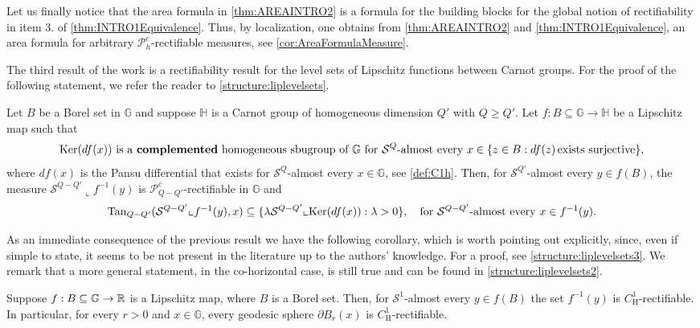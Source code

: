 \documentclass[10pt, a4paper,
oneside, headinclude,footinclude]{scrartcl}
\begin{document}
Let us finally notice that the area formula in \cref{thm:AREAINTRO2} is a formula for the building blocks for the global notion of rectifiability in item 3. of \cref{thm:INTRO1Equivalence}. Thus, by localization, one obtains from \cref{thm:AREAINTRO2} and \cref{thm:INTRO1Equivalence}, an area formula for arbitrary $\mathscr{P}_h^c$-rectifiable measures, see \cref{cor:AreaFormulaMeasure}.

The third result of the work is a rectifiability result for the level sets of Lipschitz functions between Carnot groups. For the proof of the following statement, we refer the reader to \cref{structure:liplevelsets}.

\begin{proposizione}\label{structure:liplevelsetsINTRO}
Let $B$ be a Borel set in $\mathbb{G}$ and suppose $\mathbb{H}$ is a Carnot group of homogeneous dimension $Q'$ with $Q\geq Q'$. Let $f:B\subseteq \mathbb{G}\to \mathbb{H}$ be a Lipschitz map such that
\begin{equation}
    \text{$\mathrm{Ker}(df(x))$ is a \textbf{complemented} homogeneous sbugroup of $\mathbb G$ for $\mathcal{S}^{Q}$-almost every $x\in \{z\in B:df(z)\, \text{exists surjective}\}$},
    \nonumber
\end{equation}
where $df(x)$ is the Pansu differential that exists for $\mathcal{S}^Q$-almost every $x\in\mathbb G$, see \cref{def:C1h}. Then, for $\mathcal{S}^{Q'}$-almost every $y\in f(B)$, the measure $\mathcal{S}^{Q-Q'}\llcorner f^{-1}(y)$ is $\mathscr{P}^c_{Q-Q'}$-rectifiable in $\mathbb{G}$ and 
$$
\mathrm{Tan}_{Q-Q'}(\mathcal{S}^{Q-Q'}\llcorner f^{-1}(y),x)\subseteq\{\lambda\mathcal{S}^{Q-Q'}\llcorner\mathrm{Ker}(df(x)):\lambda> 0\},\quad\text{for $\mathcal{S}^{Q-Q'}$-almost every $x\in f^{-1}(y)$.}
$$
\end{proposizione}

As an immediate consequence of the previous result we have the following corollary, which is worth pointing out explicitly, since, even if simple to state, it seems to be not present in the literature up to the authors' knowledge. For a proof, see \cref{structure:liplevelsets3}. We remark that a more general statement, in the co-horizontal case, is still true and can be found in \cref{structure:liplevelsets2}.

\begin{corollario}\label{structure:liplevelsets3Intro}
Suppose $f:B\subseteq \mathbb{G}\to \mathbb{R}$ is a Lipschitz map, where $B$ is a Borel set. Then, for $\mathcal{S}^1$-almost every $y\in f(B)$ the set $f^{-1}(y)$ is $C^1_{\mathrm H}$-rectifiable. In particular, for every $r>0$ and $x\in\mathbb G$, every geodesic sphere $\partial B_r(x)$ is $C^1_{\mathrm H}$-rectifiable.
\end{corollario}
\end{document}
